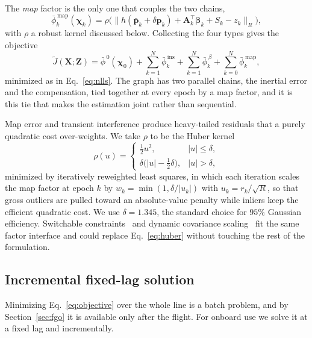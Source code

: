 \documentclass{IEEEtaes}
\begin{document}
The \emph{map} factor is the only one that couples the two chains,
\begin{equation}
\bar{\phi}^{\,\mathrm{map}}_k(\boldsymbol{\chi}_k)=
\rho\!\Big(\big\lVert h(\bar{\mathbf{p}}_k+\delta\mathbf{p}_k)
+\mathbf{A}_k^{\top}\boldsymbol{\beta}_k+S_k-z_k\big\rVert_{R}\Big),
\label{eq:fmap}
\end{equation}
with $\rho$ a robust kernel discussed below. Collecting the four types gives the
objective
\begin{equation}
\tilde{J}(\mathbf{X};\mathbf{Z})=\bar{\phi}^{\,0}(\boldsymbol{\chi}_0)
+\sum_{k=1}^{N}\bar{\phi}^{\,\mathrm{ins}}_k
+\sum_{k=1}^{N}\bar{\phi}^{\,\beta}_k
+\sum_{k=0}^{N}\bar{\phi}^{\,\mathrm{map}}_k ,
\label{eq:objective}
\end{equation}
minimized as in Eq.~\eqref{eq:nlls}. The graph has two parallel chains, the inertial
error and the compensation, tied together at every epoch by a map factor, and it
is this tie that makes the estimation joint rather than sequential.

Map error and transient interference produce heavy-tailed residuals that a
purely quadratic cost over-weights. We take $\rho$ to be the Huber
kernel~\cite{huber1964}
\begin{equation}
\rho(u)=\begin{cases}\tfrac12 u^2,& |u|\le\delta,\\
\delta\big(|u|-\tfrac12\delta\big),& |u|>\delta,\end{cases}
\label{eq:huber}
\end{equation}
minimized by iteratively reweighted least squares, in which each iteration
scales the map factor at epoch $k$ by $w_k=\min(1,\delta/|u_k|)$ with
$u_k=r_k/\sqrt{R}$, so that gross outliers are pulled toward an absolute-value
penalty while inliers keep the efficient quadratic cost. We use
$\delta=1.345$, the standard choice for $95\%$ Gaussian efficiency. Switchable
constraints~\cite{sunderhauf2012} and dynamic covariance
scaling~\cite{agarwal2013} fit the same factor interface and could
replace Eq.~\eqref{eq:huber} without touching the rest of the formulation.

\subsection{Incremental fixed-lag solution}\label{sec:incremental}
Minimizing Eq.~\eqref{eq:objective} over the whole line is a batch problem, and by
Section~\ref{sec:fgo} it is available only after the flight. For onboard use we
solve it at a fixed lag and incrementally.
\end{document}

